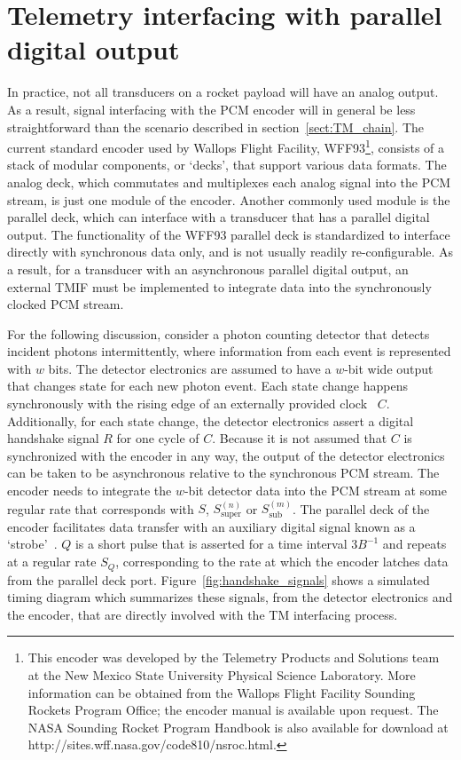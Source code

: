 \documentclass{ws-jai}
\begin{document}
\section{Telemetry interfacing with parallel digital output}
\label{sect:TMIF}
In practice, not all transducers on a rocket payload will have an analog output. As a result, signal interfacing with the PCM encoder will in general be less straightforward than the scenario described in section~\ref{sect:TM_chain}. The current standard encoder used by Wallops Flight Facility, WFF93\footnote{This encoder was developed by the Telemetry Products and Solutions team at the New Mexico State University Physical Science Laboratory. More information can be obtained from the Wallops Flight Facility Sounding Rockets Program Office; the encoder manual is available upon request. The NASA Sounding Rocket Program Handbook is also available for download at http://sites.wff.nasa.gov/code810/nsroc.html.}, consists of a stack of modular components, or `decks', that support various data formats. The analog deck, which commutates and multiplexes each analog signal into the PCM stream, is just one module of the encoder. Another commonly used module is the parallel deck, which can interface with a transducer that has a parallel digital output. The functionality of the WFF93 parallel deck is standardized to interface directly with synchronous data only, and is not usually readily re-configurable. As a result, for a transducer with an asynchronous parallel digital output, an external TMIF must be implemented to integrate data into the synchronously clocked PCM stream. 

For the following discussion, consider a photon counting detector that detects incident photons intermittently, where information from each event is represented with $w$ bits. The detector electronics are assumed to have a $w$-bit wide output that changes state for each new photon event. Each state change happens synchronously with the rising edge of an externally provided clock~\cite{Plonus01,Mano08} $C$. Additionally, for each state change, the detector electronics assert a digital handshake signal $R$ for one cycle of $C$. Because it is not assumed that $C$ is synchronized with the encoder in any way, the output of the detector electronics can be taken to be asynchronous relative to the synchronous PCM stream. The encoder needs to integrate the $w$-bit detector data into the PCM stream at some regular rate that corresponds with $S$, $S_{\text{super}}^{(n)}$ or  $S_{\text{sub}}^{(m)}$. The parallel deck of the encoder facilitates data transfer with an auxiliary digital signal known as a `strobe'~\cite[$Q$ hereafter;][]{Mano08}. $Q$ is a short pulse that is asserted for a time interval $3 B^{-1}$ and repeats at a regular rate $S_Q$, corresponding to the rate at which the encoder latches data from the parallel deck port. Figure~\ref{fig:handshake_signals} shows a simulated timing diagram which summarizes these signals, from the detector electronics and the encoder, that are directly involved with the TM interfacing process.
\end{document}
